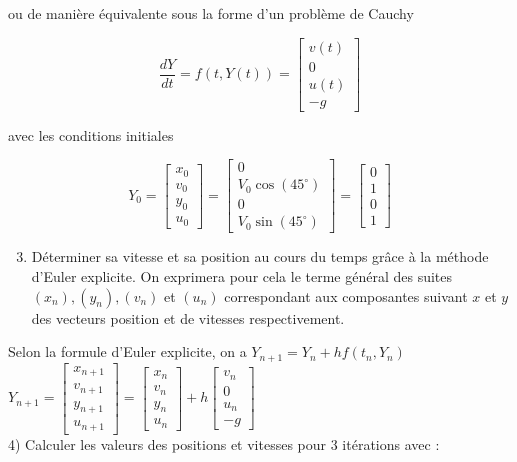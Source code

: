 \documentclass[10pt]{article}
\begin{document}
ou de manière équivalente sous la forme d'un problème de Cauchy

\[
\frac{d Y}{d t}=f(t, Y(t))=\left[\begin{array}{c}
v(t) \\
0 \\
u(t) \\
-g
\end{array}\right]
\]

avec les conditions initiales

\[
Y_{0}=\left[\begin{array}{l}
x_{0} \\
v_{0} \\
y_{0} \\
u_{0}
\end{array}\right]=\left[\begin{array}{c}
0 \\
V_{0} \cos \left(45^{\circ}\right) \\
0 \\
V_{0} \sin \left(45^{\circ}\right)
\end{array}\right]=\left[\begin{array}{l}
0 \\
1 \\
0 \\
1
\end{array}\right]
\]

\begin{enumerate}
  \setcounter{enumi}{2}
  \item Déterminer sa vitesse et sa position au cours du temps grâce à la méthode d'Euler explicite. On exprimera pour cela le terme général des suites \(\left(x_{n}\right),\left(y_{n}\right),\left(v_{n}\right)\) et \(\left(u_{n}\right)\) correspondant aux composantes suivant \(x\) et \(y\) des vecteurs position et de vitesses respectivement.
\end{enumerate}

Selon la formule d'Euler explicite, on a \(Y_{n+1}=Y_{n}+h f\left(t_{n}, Y_{n}\right)\)\\
\(Y_{n+1}=\left[\begin{array}{c}x_{n+1} \\ v_{n+1} \\ y_{n+1} \\ u_{n+1}\end{array}\right]=\left[\begin{array}{c}x_{n} \\ v_{n} \\ y_{n} \\ u_{n}\end{array}\right]+h\left[\begin{array}{c}v_{n} \\ 0 \\ u_{n} \\ -g\end{array}\right]\)\\
4) Calculer les valeurs des positions et vitesses pour 3 itérations avec :
\end{document}
